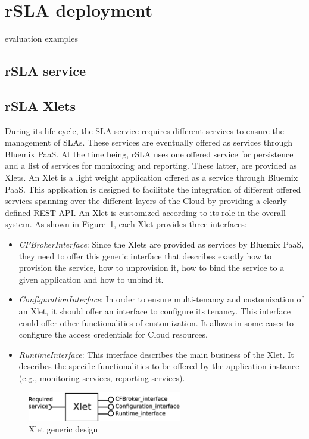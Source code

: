 \section{rSLA deployment }
evaluation examples

\subsection{rSLA service}

\subsection{rSLA Xlets}
During its life-cycle, the SLA service requires different services to ensure the management of 
SLAs. These services are eventually offered as services through Bluemix PaaS. At the time being, 
rSLA uses one offered service for persistence and a list of services for monitoring and reporting. 
These latter, are provided as Xlets. An Xlet is a light weight application offered as a service 
through Bluemix PaaS. This application is designed to facilitate the integration of different 
offered services spanning over the different layers of the Cloud by providing a clearly defined REST 
API. An Xlet is customized according to its role in the overall system. As shown in 
Figure~\ref{fig:xlet}, each Xlet provides three interfaces:
\begin{itemize}
 \item \emph{CFBrokerInterface}: Since the Xlets are provided as services by Bluemix PaaS, they need 
to offer this generic interface that describes exactly how to provision the service, how to 
unprovision it, how to bind the service to a given application and how to unbind it.
 \item  \emph{ConfigurationInterface}: In order to ensure multi-tenancy and customization of an 
Xlet, it should offer an interface to configure its tenancy. This interface could offer other 
functionalities of customization. It allows in some cases to configure the access credentials for 
Cloud resources.
 \item  \emph{RuntimeInterface}: This interface describes the main business of the Xlet. It 
describes the specific functionalities to be offered by the application instance (e.g., monitoring 
services, reporting services). 
\end{itemize}
\begin{figure}[H]
\centering
\includegraphics[width=0.6\textwidth]{pics/Xlet}
\caption{\label{fig:xlet} Xlet generic design}
\end{figure}

